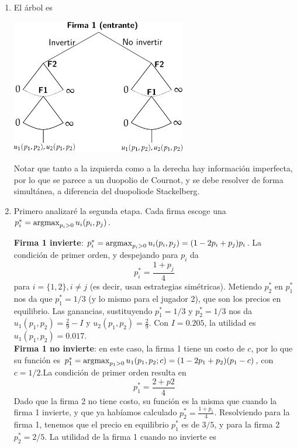 \documentclass[12pt]{article} %
\begin{document}
\begin{Exercise}[name={Respuesta}]

  \begin{enumerate}
    \setlength{\itemsep}{0pt}
    \setlength{\parskip}{0pt}
    \setlength{\parsep}{0pt}
    \item El árbol es
          \begin{center}
            \includegraphics[width=0.6\textwidth]{figs/ex_p5_1.png}
          \end{center}
          Notar que tanto a la izquierda como a la derecha hay información imperfecta, por lo que se parece a un duopolio de Cournot, y se debe resolver de forma simultánea, a diferencia del duopoliode Stackelberg.
    \item Primero analizaré la segunda etapa. Cada firma escoge una $ p_i^* = \operatorname*{argmax}_{p_i > 0} u_i(p_i, p_j) $.

          \textbf{Firma 1 invierte}: $ p_i^* = \operatorname*{argmax}_{p_i > 0} u_i(p_i, p_j) = (1 - 2p_i + p_j)p_i $. La condición de primer orden, y despejando para $ p_i $ da
          \[p_i^* = \frac{1 + p_j}{4}\]
          para $ i = \{1, 2\}, i\neq j$ (es decir, usan estrategias simétricas).  Metiendo $ p_2^* $ en $ p_1^* $ nos da que $ p_1^* = 1/3$ (y lo mismo para el jugador 2), que son los precios en equilibrio. Las ganancias, sustituyendo $ p_1^* = 1/3 $ y $ p_2^* = 1/3 $ nos da $u_1(p_1, p_2) = \frac{2}{9} - I$ y $ u_2(p_1, p_2) = \frac{2}{9} $. Con $ I = 0.205 $, la utilidad es $u_1(p_1, p_2) = 0.017$.\\
          \textbf{Firma 1 no invierte}: en este caso, la firma 1 tiene un costo de $c$, por lo que su función es $ p_1^* = \operatorname*{argmax}_{p_1 > 0} u_1(p_1, p_2; c) = (1 - 2p_1 + p_2)(p_1 - c) $, con $ c=1/2 $.La condición de primer orden resulta en
          \[p_1^* = \frac{2+p2}{4} \]
          Dado que la firma 2 no tiene costo, su función es la misma que cuando la firma 1 invierte, y que ya habíamos calculado $ p_2^* = \frac{1 + p_1}{4} $. Resolviendo para la firma 1, tenemos que el precio en equilibrio $ p_1^* $ es de $ 3/5 $, y para la firma 2 $ p_2^*  = 2/5$. La utilidad de la firma 1 cuando no invierte es


\end{enumerate}
\end{Exercise}
\end{document}
